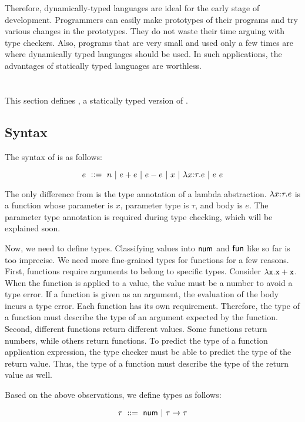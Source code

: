 Therefore, dynamically-typed languages are ideal for the early stage of
development. Programmers can easily make prototypes of their programs and try
various changes in the prototypes. They do not waste their time arguing with type
checkers. Also, programs that are very small and used only a few times are where
dynamically typed languages should be used. In such applications, the advantages
of statically typed languages are worthless.

\section{\lang}

This section defines \lang, a statically typed version of \plang.

\subsection{Syntax}

The syntax of \lang is as follows:

\[
e\ ::=\ n
\ |\ e + e
\ |\ e - e
\ |\ x
\ |\ \lambda x{:}\tau.e
\ |\ e\ e
\]

The only difference from \plang is the type annotation of a lambda abstraction.
$\lambda x{:}\tau.e$ is a function whose parameter is $x$, parameter type is
$\tau$, and body is $e$. The parameter type annotation is required during
type checking, which will be explained soon.

Now, we need to define types. Classifying values into $\textsf{num}$ and $\textsf{fun}$ like so
far is too imprecise. We need more fine-grained types for functions for a few
reasons. First, functions require arguments to belong to specific types.
Consider $\lambda\texttt{x}.\texttt{x}+\texttt{x}$. When the function is applied to a value, the
value must be a number to avoid a type error. If a function is given as an
argument, the evaluation of the body incurs a type error. Each function has its
own requirement. Therefore, the type of a function must describe the type of an
argument expected by the function. Second, different functions return different
values. Some functions return numbers, while others return functions. To
predict the type of a function application expression, the type checker must be
able to predict the type of the return value. Thus, the type of a function must
describe the type of the return value as well.

Based on the above observations, we define types as follows:

\[
\tau\ ::=\ \tnum\ |\ \tarrow{\tau}{\tau}
\]

